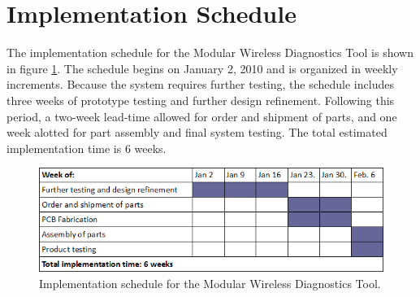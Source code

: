 \section{Implementation Schedule}
The implementation schedule for the Modular Wireless Diagnostics Tool is shown
in figure \ref{fig:implement sched}. The schedule begins on January 2, 2010 and 
is organized in weekly increments. Because the system requires further testing,
the schedule includes three weeks of prototype testing and further design refinement.
Following this period, a two-week lead-time allowed for order and shipment of parts, 
and one week alotted for part assembly and final system testing. The total estimated
implementation time is 6 weeks.


\begin{figure}[bhp]
\begin{center}
\includegraphics[scale=0.55]{../drawings/implement_sched.png}
\end{center}
\caption[Implementation Schedule]{Implementation schedule for the Modular Wireless
Diagnostics Tool.}
\label{fig:implement sched}
\end{figure}
